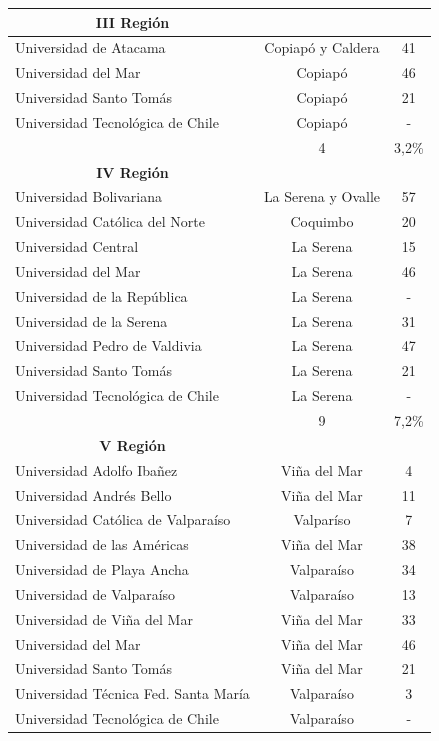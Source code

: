 \begin{table}[htb!]
{\begin{tabular}{|l|c|c|}
	\hline
	\multicolumn{1}{|c|}{\textbf{III Región}}\\
	\hline
	Universidad de Atacama			& Copiapó y Caldera	& 41\\
	Universidad del Mar			& Copiapó		& 46\\
	Universidad Santo Tomás			& Copiapó		& 21\\
	Universidad Tecnológica de Chile	& Copiapó		& -\\
	\hline
	\textbf{\blue{Total}}			&4			&3,2\% \\
	\hline
	\multicolumn{1}{|c|}{\textbf{IV Región}}\\
	\hline
	Universidad Bolivariana			& La Serena y Ovalle	& 57\\
	Universidad Católica del Norte		& Coquimbo		& 20\\
	Universidad Central			& La Serena		& 15\\
	Universidad del Mar			& La Serena		& 46\\
	Universidad de la República		& La Serena		& -\\
	Universidad de la Serena		& La Serena		& 31\\
	Universidad Pedro de Valdivia		& La Serena		& 47\\
	Universidad Santo Tomás			& La Serena		& 21\\
	Universidad Tecnológica de Chile	& La Serena		& -\\
	\hline
	\textbf{\blue{Total}}			&9			&7,2\% \\
	\hline
	\multicolumn{1}{|c|}{\textbf{V Región}}\\
	\hline
	Universidad Adolfo Ibañez		& Viña del Mar		& 4\\
	Universidad Andrés Bello		& Viña del Mar		& 11\\
	Universidad Católica de Valparaíso	& Valparíso		& 7\\
	Universidad de las Américas		& Viña del Mar		& 38\\
	Universidad de Playa Ancha		& Valparaíso		& 34\\
	Universidad de Valparaíso		& Valparaíso		& 13\\
	Universidad de Viña del Mar		& Viña del Mar		& 33\\
	Universidad del Mar			& Viña del Mar		& 46\\
	Universidad Santo Tomás			& Viña del Mar		& 21\\
	Universidad Técnica Fed. Santa María	& Valparaíso		& 3 \\
	Universidad Tecnológica de Chile	& Valparaíso		& -\\

\end{tabular}}
\end{table}
